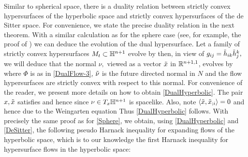Similar to spherical space, there is a duality relation between strictly convex hypersurfaces of the hyperbolic space and strictly convex hypersurfaces of the de Sitter space. For convenience, we state the precise duality relation in the next theorem.
With a similar calculation as for the sphere case (see, for example, the proof  of \cite[Lemma~4.2]{Yu:04/2016}) we can deduce the evolution of the dual hypersurface. Let a family of strictly convex hypersurfaces $M_{t}\sub\H^{n+1}$ evolve by
then, in view of $g_{ij}=\~h_{ik}\~h^{k}_{j},$ we will deduce that the normal $\nu,$ viewed as a vector $\~x$ in $\R^{n+1,1}$, evolves by
where $\Phi$ is as in \eqref{DualFlow-3}, $\~\nu$ is the future directed normal in $N$ and the flow hypersurfaces are strictly convex with respect to this normal. For convenience of the reader, we present more details on how to obtain \eqref{DualHyperbolic}. The pair $x,\~x$ satisfies
 and hence
 since $\nu\in T_x \H^{n+1}$ is spacelike. Also, note $\ip{\~x}{\~x_{;i}}=0$ and hence due to the Weingarten equation
 Thus \eqref{DualHyperbolic} follows.
With precisely the same proof as for \cref{Sphere}, we obtain, using \eqref{DualHyperbolic} and \cref{DeSitter}, the following pseudo Harnack inequality for expanding flows of the hyperbolic space, which is to our knowledge the first Harnack inequality for hypersurface flows in the hyperbolic space:
